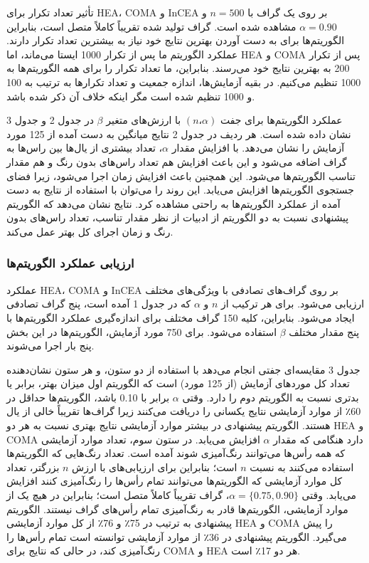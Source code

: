 \documentclass[a4paper,10pt]{article}
\begin{document}
                تأثیر تعداد تکرار برای HEA، COMA و InCEA بر روی یک گراف با $n = 500$ و $\alpha = 0.90$ مشاهده شده است. گراف تولید شده تقریباً کاملاً متصل است، بنابراین الگوریتم‌ها برای به دست آوردن بهترین نتایج خود نیاز به بیشترین تعداد تکرار دارند. عملکرد الگوریتم ما پس از تکرار 1000 ایستا می‌ماند، اما HEA و COMA پس از تکرار 200 به بهترین نتایج خود می‌رسند. بنابراین، ما تعداد تکرار را برای همه الگوریتم‌ها به 1000 تنظیم می‌کنیم. در بقیه آزمایش‌ها، اندازه جمعیت و تعداد تکرارها به ترتیب به 100 و 1000 تنظیم شده است مگر اینکه خلاف آن ذکر شده باشد.

                عملکرد الگوریتم‌ها برای جفت $(n، \alpha)$ با ارزش‌های متغیر $\beta$ در جدول 2 و جدول 3 نشان داده شده است. هر ردیف در جدول 2 نتایج میانگین به دست آمده از 125 مورد آزمایش را نشان می‌دهد. با افزایش مقدار $\alpha$، تعداد بیشتری از یال‌ها بین راس‌ها به گراف اضافه می‌شود و این باعث افزایش هم تعداد راس‌های بدون رنگ و هم مقدار تناسب الگوریتم‌ها می‌شود. این همچنین باعث افزایش زمان اجرا می‌شود، زیرا فضای جستجوی الگوریتم‌ها افزایش می‌یابد. این روند را می‌توان با استفاده از نتایج به دست آمده از عملکرد الگوریتم‌ها به راحتی مشاهده کرد. نتایج نشان می‌دهد که الگوریتم پیشنهادی نسبت به دو الگوریتم از ادبیات از نظر مقدار تناسب، تعداد راس‌های بدون رنگ و زمان اجرای کل بهتر عمل می‌کند.

            \subsubsection{ارزیابی عملکرد الگوریتم‌ها}

                عملکرد HEA، COMA و InCEA بر روی گراف‌های تصادفی با ویژگی‌های مختلف ارزیابی می‌شود. برای هر ترکیب از $n$ و $\alpha$ که در جدول 1 آمده است، پنج گراف تصادفی ایجاد می‌شود. بنابراین، کلیه 150 گراف مختلف برای اندازه‌گیری عملکرد الگوریتم‌ها با پنج مقدار مختلف $\beta$ استفاده می‌شود. برای 750 مورد آزمایش، الگوریتم‌ها در این بخش پنج بار اجرا می‌شوند.

                جدول 3 مقایسه‌ای جفتی انجام می‌دهد با استفاده از دو ستون، و هر ستون نشان‌دهنده تعداد کل موردهای آزمایش (از 125 مورد) است که الگوریتم اول میزان بهتر، برابر یا بدتری نسبت به الگوریتم دوم را دارد. وقتی $\alpha$ برابر با 0.10 باشد، الگوریتم‌ها حداقل در 60٪ از موارد آزمایشی نتایج یکسانی را دریافت می‌کنند زیرا گراف‌ها تقریباً خالی از یال هستند. الگوریتم پیشنهادی در بیشتر موارد آزمایشی نتایج بهتری نسبت به هر دو HEA و COMA دارد هنگامی که مقدار $\alpha$ افزایش می‌یابد. در ستون سوم، تعداد موارد آزمایشی که همه رأس‌ها می‌توانند رنگ‌آمیزی شوند آمده است. تعداد رنگ‌هایی که الگوریتم‌ها استفاده می‌کنند به نسبت $n$ است؛ بنابراین برای ارزیابی‌های با ارزش $n$ بزرگتر، تعداد کل موارد آزمایشی که الگوریتم‌ها می‌توانند تمام رأس‌ها را رنگ‌آمیزی کنند افزایش می‌یابد. وقتی $\alpha = \{0.75, 0.90\}$، گراف تقریباً کاملاً متصل است؛ بنابراین در هیچ یک از موارد آزمایشی، الگوریتم‌ها قادر به رنگ‌آمیزی تمام رأس‌های گراف نیستند. الگوریتم پیشنهادی به ترتیب در 75٪ و 76٪ از کل موارد آزمایشی HEA و COMA را پیش می‌گیرد. الگوریتم پیشنهادی در 36٪ از موارد آزمایشی توانسته است تمام رأس‌ها را رنگ‌آمیزی کند، در حالی که نتایج برای COMA و HEA هر دو 17٪ است.
\end{document}
